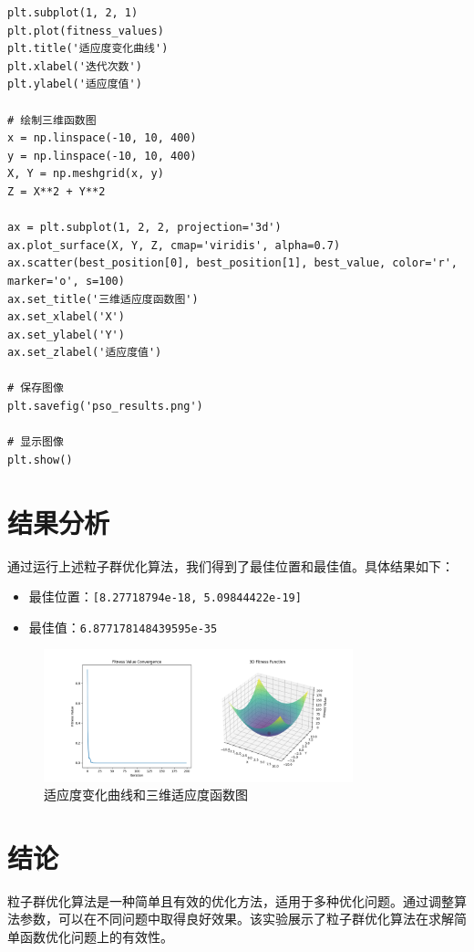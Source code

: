 \documentclass{ctexart}
\begin{document}
\begin{verbatim}
plt.subplot(1, 2, 1)
plt.plot(fitness_values)
plt.title('适应度变化曲线')
plt.xlabel('迭代次数')
plt.ylabel('适应度值')

# 绘制三维函数图
x = np.linspace(-10, 10, 400)
y = np.linspace(-10, 10, 400)
X, Y = np.meshgrid(x, y)
Z = X**2 + Y**2

ax = plt.subplot(1, 2, 2, projection='3d')
ax.plot_surface(X, Y, Z, cmap='viridis', alpha=0.7)
ax.scatter(best_position[0], best_position[1], best_value, color='r', marker='o', s=100)
ax.set_title('三维适应度函数图')
ax.set_xlabel('X')
ax.set_ylabel('Y')
ax.set_zlabel('适应度值')

# 保存图像
plt.savefig('pso_results.png')

# 显示图像
plt.show()
\end{verbatim}

\section{结果分析}
通过运行上述粒子群优化算法，我们得到了最佳位置和最佳值。具体结果如下：

\begin{itemize}
    \item 最佳位置：\texttt{[8.27718794e-18, 5.09844422e-19]}
    \item 最佳值：\texttt{6.877178148439595e-35}
\end{itemize}

\begin{figure}[h!]
    \centering
    \includegraphics[width=0.8\textwidth]{pso_results.png}
    \caption{适应度变化曲线和三维适应度函数图}
    \label{fig:pso_results}
\end{figure}

\section{结论}
粒子群优化算法是一种简单且有效的优化方法，适用于多种优化问题。通过调整算法参数，可以在不同问题中取得良好效果。该实验展示了粒子群优化算法在求解简单函数优化问题上的有效性。
\end{document}
